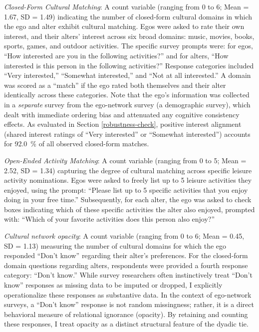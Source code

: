 \documentclass[12pt,letterpaper]{article}
\def\percent{\%}%
\begin{document}
\emph{Closed-Form Cultural Matching}: A count variable (ranging from 0 to 6; Mean = 1.67, SD = 1.49) indicating the number of closed-form cultural domains in which the ego and alter exhibit cultural matching. Egos were asked to rate their own interest, and their alters' interest across six broad domains: music, movies, books, sports, games, and outdoor activities. The specific survey prompts were: for egos, ``How interested are you in the following activities?'' and for alters, ``How interested is this person in the following activities?'' Response categories included ``Very interested,'' ``Somewhat interested,'' and ``Not at all interested.'' A domain was scored as a ``match'' if the ego rated both themselves and their alter identically across these categories. Note that the ego's information was collected in a \textit{separate} survey from the ego-network survey (a demographic survey), which dealt with immediate ordering bias and attenuated any cognitive consistency effects. As evaluated in Section \ref{robustness-check}, positive interest alignment (shared interest ratings of ``Very interested'' or ``Somewhat interested'') accounts for \SI{92.0}{\percent} of all observed closed-form matches.

\emph{Open-Ended Activity Matching}: A count variable (ranging from 0 to 5; Mean = 2.52, SD = 1.34) capturing the degree of cultural matching across specific leisure activity nominations. Egos were asked to freely list up to 5 leisure activities they enjoyed, using the prompt: ``Please list up to 5 specific activities that you enjoy doing in your free time.'' Subsequently, for each alter, the ego was asked to check boxes indicating which of these specific activities the alter also enjoyed, prompted with: ``Which of your favorite activities does this person also enjoy?''

\emph{Cultural network opacity}: A count variable (ranging from 0 to 6; Mean = 0.45, SD = 1.13) measuring the number of cultural domains for which the ego responded ``Don't know'' regarding their alter's preferences. For the closed-form domain questions regarding alters, respondents were provided a fourth response category: ``Don't know.'' While survey researchers often instinctively treat ``Don't know'' responses as missing data to be imputed or dropped, I explicitly operationalize these responses as substantive data. In the context of ego-network surveys, a ``Don't know'' response is not random missingness; rather, it is a direct behavioral measure of relational ignorance (opacity). By retaining and counting these responses, I treat opacity as a distinct structural feature of the dyadic tie.
\end{document}
